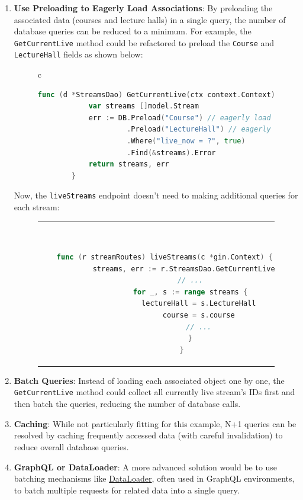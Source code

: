 \begin{enumerate}
    \item \textbf{Use Preloading to Eagerly Load Associations}: By preloading the associated data (courses and lecture halls) in a single query, the number of database queries can be reduced to a minimum. For example, the \texttt{GetCurrentLive} method could be refactored to preload the \texttt{Course} and \texttt{LectureHall} fields as shown below:

    \begin{figure}[htpb]
      \begin{tabular}{c}
      \ \small \begin{lstlisting}[language=Go]
        func (d *StreamsDao) GetCurrentLive(ctx context.Context) ([]model.Stream, error) {
            var streams []model.Stream
            err := DB.Preload("Course") // eagerly load stream's course
                     .Preload("LectureHall") // eagerly load stream's lecturehalls
                     .Where("live_now = ?", true)
                     .Find(&streams).Error
            return streams, err
        }
      \end{lstlisting}
      \end{tabular}
    \end{figure}

        Now, the \texttt{liveStreams} endpoint doesn't need to making additional queries for each stream:
    
    \begin{figure}[htpb]
      \begin{tabular}{c}
      \ \small \begin{lstlisting}[language=Go]
        func (r streamRoutes) liveStreams(c *gin.Context) {
            streams, err := r.StreamsDao.GetCurrentLive(c)
            // ...
            for _, s := range streams {
                lectureHall = s.LectureHall
                course = s.course
                // ...
            }
        }
      \end{lstlisting}
      \end{tabular}
    \end{figure}

    \item \textbf{Batch Queries}: Instead of loading each associated object one by one, the \texttt{GetCurrentLive} method could collect all currently live stream's IDs first and then batch the queries, reducing the number of database calls.

    \item \textbf{Caching}: While not particularly fitting for this example, N+1 queries can be resolved by caching frequently accessed data (with careful invalidation) to reduce overall database queries.

    \item \textbf{GraphQL or DataLoader}: A more advanced solution would be to use batching mechanisms like \href{https://github.com/graphql/dataloader}{DataLoader}, often used in GraphQL environments, to batch multiple requests for related data into a single query.
\end{enumerate}



